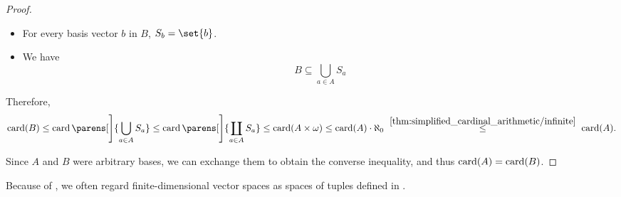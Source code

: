 \begin{proof}
\begin{itemize}
    \item For every basis vector \( b \) in \( B \), \( S_b = \set{ b } \).

    \item We have
    \begin{equation*}
      B \subseteq \bigcup_{a \in A} S_a
    \end{equation*}
  \end{itemize}

  Therefore,
  \begin{equation*}
    \card(B)
    \leq
    \card\parens[\Bigg]{ \bigcup_{a \in A} S_a }
    \leq
    \card\parens[\Bigg]{ \coprod_{a \in A} S_a }
    \leq
    \card(A \times \omega)
    \leq
    \card(A) \cdot \aleph_0
    \reloset {\ref{thm:simplified_cardinal_arithmetic/infinite}} \leq
    \card(A).
  \end{equation*}

  Since \( A \) and \( B \) were arbitrary bases, we can exchange them to obtain the converse inequality, and thus \( \operatorname{card}(A) = \operatorname{card}(B) \).
\end{proof}

\begin{remark}\label{rem:finite_dimensional_vector_space_uniqueness}
  Because of , we often regard finite-dimensional vector spaces as spaces of tuples defined in .
\end{remark}

